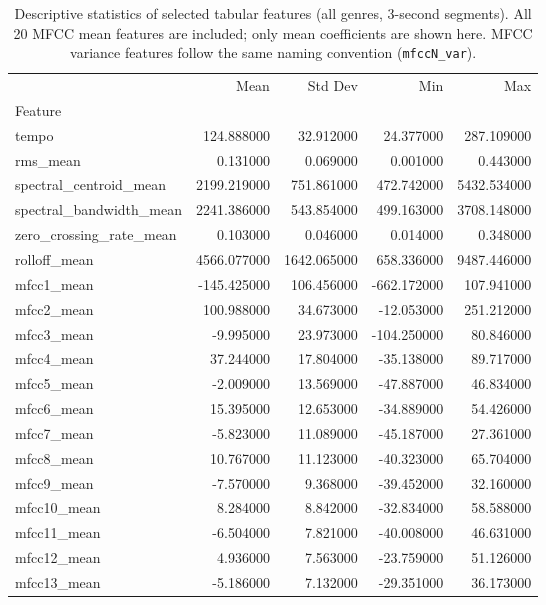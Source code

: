 \begin{table}[H]
\centering
\caption{Descriptive statistics of selected tabular features (all genres, 3-second segments). All 20 MFCC mean features are included; only mean coefficients are shown here. MFCC variance features follow the same naming convention (\texttt{mfccN\_var}).}
\label{tab:desc_overall}
\footnotesize
\begin{tabular}{lrrrr}
\toprule
 & Mean & Std Dev & Min & Max \\
Feature &  &  &  &  \\
\midrule
tempo & 124.888000 & 32.912000 & 24.377000 & 287.109000 \\
rms\_mean & 0.131000 & 0.069000 & 0.001000 & 0.443000 \\
spectral\_centroid\_mean & 2199.219000 & 751.861000 & 472.742000 & 5432.534000 \\
spectral\_bandwidth\_mean & 2241.386000 & 543.854000 & 499.163000 & 3708.148000 \\
zero\_crossing\_rate\_mean & 0.103000 & 0.046000 & 0.014000 & 0.348000 \\
rolloff\_mean & 4566.077000 & 1642.065000 & 658.336000 & 9487.446000 \\
mfcc1\_mean & -145.425000 & 106.456000 & -662.172000 & 107.941000 \\
mfcc2\_mean & 100.988000 & 34.673000 & -12.053000 & 251.212000 \\
mfcc3\_mean & -9.995000 & 23.973000 & -104.250000 & 80.846000 \\
mfcc4\_mean & 37.244000 & 17.804000 & -35.138000 & 89.717000 \\
mfcc5\_mean & -2.009000 & 13.569000 & -47.887000 & 46.834000 \\
mfcc6\_mean & 15.395000 & 12.653000 & -34.889000 & 54.426000 \\
mfcc7\_mean & -5.823000 & 11.089000 & -45.187000 & 27.361000 \\
mfcc8\_mean & 10.767000 & 11.123000 & -40.323000 & 65.704000 \\
mfcc9\_mean & -7.570000 & 9.368000 & -39.452000 & 32.160000 \\
mfcc10\_mean & 8.284000 & 8.842000 & -32.834000 & 58.588000 \\
mfcc11\_mean & -6.504000 & 7.821000 & -40.008000 & 46.631000 \\
mfcc12\_mean & 4.936000 & 7.563000 & -23.759000 & 51.126000 \\
mfcc13\_mean & -5.186000 & 7.132000 & -29.351000 & 36.173000 \\

\end{tabular}
\end{table}
